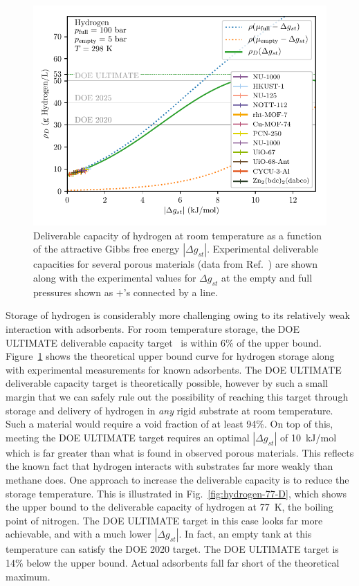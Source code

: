 \documentclass[pre,twocolumn]{revtex4-2}
\newcommand\gst{\ensuremath{\Delta g_{st}}}
\begin{document}
\begin{figure}
    \centering
    \includegraphics[width=0.95\columnwidth]{hydrogen-298-n-vs-G}
    \caption{Deliverable capacity of hydrogen at room temperature as a function of the attractive Gibbs free energy $|\gst|$.  Experimental deliverable capacities for several porous materials (data from Ref.~\cite{garcia2018benchmark}) are shown along with the experimental values for $\gst$ at the empty and full pressures shown as $+$'s connected by a line.}
    \label{fig:hydrogen-298-D}
\end{figure}

Storage of hydrogen is considerably more challenging owing to its relatively
weak interaction with adsorbents. For room temperature storage, the DOE
ULTIMATE deliverable capacity target~\cite{DOE} is within 6\% of the upper
bound. Figure~\ref{fig:hydrogen-298-D} shows the theoretical upper bound curve
for hydrogen storage along with experimental measurements for known adsorbents. The
DOE ULTIMATE deliverable capacity target is theoretically possible, however by
such a small margin that we can safely rule out the possibility of reaching
this target through storage and delivery of hydrogen in \emph{any} rigid
substrate at room temperature. Such a material would require a void fraction of
at least 94\%. On top of this, meeting the DOE ULTIMATE target requires an optimal
$|\gst|$ of 10~kJ/mol which is far greater than what is found in observed
porous materials. This reflects the known fact that hydrogen interacts with
substrates far more weakly than methane does. 
One approach to increase the deliverable capacity is to reduce the storage
temperature. This is illustrated in Fig.~\ref{fig:hydrogen-77-D}, which shows
the upper bound to the deliverable capacity of hydrogen at 77\ K, the boiling
point of nitrogen. The DOE ULTIMATE target in this case looks far more
achievable, and with a much lower $|\gst|$. In fact, an empty tank at this
temperature can satisfy the DOE 2020 target. The DOE ULTIMATE target is 14\%
below the upper bound. Actual adsorbents fall far short of the theoretical maximum.
\end{document}
